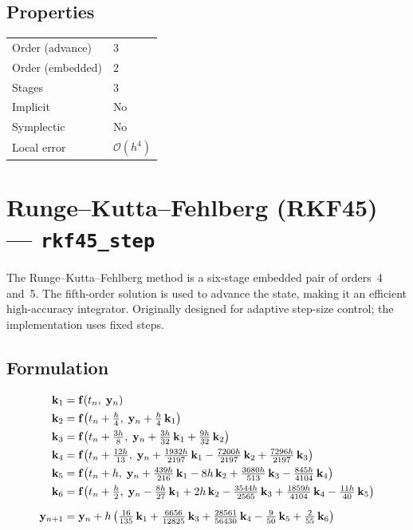 \documentclass[11pt,a4paper]{article}
\newcommand{\bk}{\mathbf{k}}
\newcommand{\by}{\mathbf{y}}
\newcommand{\bff}{\mathbf{f}}
\newcommand{\bigO}{\mathcal{O}}
\begin{document}
\subsection{Properties}
\begin{center}
\begin{tabular}{ll}
  \hline
  Order (advance)  & 3 \\
  Order (embedded) & 2 \\
  Stages           & 3 \\
  Implicit         & No \\
  Symplectic       & No \\
  Local error      & $\bigO(h^4)$ \\
  \hline
\end{tabular}
\end{center}

\section{Runge--Kutta--Fehlberg (RKF45) --- \texttt{rkf45\_step}}
\label{sec:rkf45}

The Runge--Kutta--Fehlberg method is a six-stage embedded pair of orders~4
and~5. The fifth-order solution is used to advance the state, making it an
efficient high-accuracy integrator. Originally designed for adaptive step-size
control; the implementation uses fixed steps.

\subsection{Formulation}
\begin{align}
  \bk_1 &= \bff(t_n,\;\by_n) \notag\\
  \bk_2 &= \bff\!\left(t_n + \tfrac{h}{4},\;\by_n
            + \tfrac{h}{4}\,\bk_1\right) \notag\\
  \bk_3 &= \bff\!\left(t_n + \tfrac{3h}{8},\;\by_n
            + \tfrac{3h}{32}\,\bk_1 + \tfrac{9h}{32}\,\bk_2\right) \notag\\
  \bk_4 &= \bff\!\left(t_n + \tfrac{12h}{13},\;\by_n
            + \tfrac{1932h}{2197}\,\bk_1
            - \tfrac{7200h}{2197}\,\bk_2
            + \tfrac{7296h}{2197}\,\bk_3\right) \notag\\
  \bk_5 &= \bff\!\left(t_n + h,\;\by_n
            + \tfrac{439h}{216}\,\bk_1 - 8h\,\bk_2
            + \tfrac{3680h}{513}\,\bk_3
            - \tfrac{845h}{4104}\,\bk_4\right) \notag\\
  \bk_6 &= \bff\!\left(t_n + \tfrac{h}{2},\;\by_n
            - \tfrac{8h}{27}\,\bk_1 + 2h\,\bk_2
            - \tfrac{3544h}{2565}\,\bk_3
            + \tfrac{1859h}{4104}\,\bk_4
            - \tfrac{11h}{40}\,\bk_5\right) \notag\\[6pt]
  \by_{n+1} &= \by_n + h\left(\tfrac{16}{135}\,\bk_1
               + \tfrac{6656}{12825}\,\bk_3
               + \tfrac{28561}{56430}\,\bk_4
               - \tfrac{9}{50}\,\bk_5
               + \tfrac{2}{55}\,\bk_6\right)
  \label{eq:rkf45}
\end{align}
\end{document}
